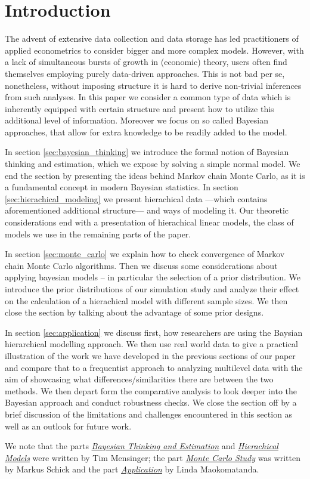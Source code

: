 \section{Introduction}

The advent of extensive data collection and data storage has led practitioners of applied econometrics to consider bigger and more complex models.
However, with a lack of simultaneous bursts of growth in (economic) theory, users often find themselves employing purely data-driven approaches.
This is not bad per se, nonetheless, without imposing structure it is hard to derive non-trivial inferences from such analyses.
In this paper we consider a common type of data which is inherently equipped with certain structure and present how to utilize this additional level of information.
Moreover we focus on so called Bayesian approaches, that allow for extra knowledge to be readily added to the model.

In section \ref{sec:bayesian_thinking} we introduce the formal notion of Bayesian thinking and estimation, which we expose by solving a simple normal model.
We end the section by presenting the ideas behind Markov chain Monte Carlo, as it is a fundamental concept in modern Bayesian statistics. In section \ref{sec:hierachical_modeling} we present hierachical data ---which contains aforementioned additional structure--- and ways of modeling it.
Our theoretic considerations end with a presentation of hierachical linear models, the class of models we use in the remaining parts of the paper.

In section \ref{sec:monte_carlo} we explain how to check convergence of Markov chain Monte Carlo algorithms. 
Then we discuss some considerations about applying bayesian models -- in particular the selection of a prior distribution. 
We introduce the prior distributions of our simulation study and analyze their effect on the calculation of a hierachical model with different sample sizes. 
We then close the section by talking about the advantage of some prior designs. 


In section \ref{sec:application} we discuss first, how researchers are using the Baysian hierarchical modelling approach. We then use real world data to give a practical illustration of the work we have developed in the previous sections of our paper and compare that to a frequentist approach to analyzing multilevel data with the aim of showcasing what differences/similarities there are between the two methods. We then depart form the comparative analysis to look deeper into the Bayesian approach and conduct robustness checks. We close the section off by a brief discussion of the limitations and challenges encountered in this section as well as an outlook for future work.

We note that the parts \hyperref[sec:bayesian_thinking]{\emph{Bayesian Thinking and Estimation}} and \hyperref[sec:hierachical_modeling]{\emph{Hierachical Models}} were written by Tim Mensinger; the part \hyperref[sec:monte_carlo]{\emph{Monte Carlo Study}} was written by Markus Schick and the part \hyperref[sec:application]{\emph{Application}} by Linda Maokomatanda.
